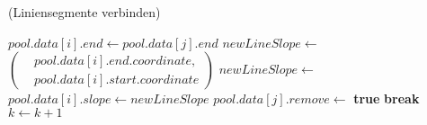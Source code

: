 \begin{algorithm}[!ht]\small
\caption{ (Liniensegmente verbinden)}
\label{alg:mergelines5}
\begin{algorithmic}[1]
	\label{alg:mergelines5-extendline}
		\State $\mathit{pool.data}[i]\mathit{.end} \gets \mathit{pool.data}[j]\mathit{.end}$
		\label{alg:mergelines5-merge-start}
		\State $\mathit{newLineSlope} \gets$ 
		$\left(
		\begin{aligned}
			& \mathit{pool.data}[i]\mathit{.end.coordinate},\\
			& \mathit{pool.data}[i]\mathit{.start.coordinate}
		\end{aligned}\right)$
		\State $\mathit{newLineSlope} \gets$ 
		\State $\mathit{pool.data}[i]\mathit{.slope} \gets \mathit{newLineSlope}$
		\State $\mathit{pool.data}[j]\mathit{.remove} \gets$ \textbf{true}
		\label{alg:mergelines5-merge-end}
	\Else
		\State \textbf{break}
	\EndIf
	\State $k \gets k + 1$
	\EndFor
	\label{alg:mergelines5-loop-end}
\end{algorithmic}
\end{algorithm}
